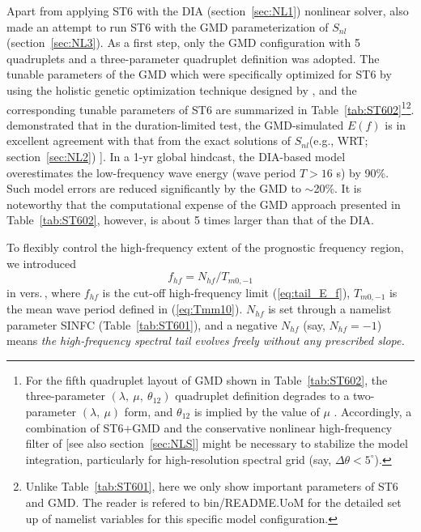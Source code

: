Apart from applying {\code ST6} with the {\code DIA} (section~\ref{sec:NL1}) nonlinear solver, \citet{Liu2018}
also made an attempt to run {\code ST6} with the {\code GMD} parameterization of $S_{nl}$
(section~\ref{sec:NL3}). As a first step, only the {\code GMD} configuration with
5 quadruplets and a three-parameter quadruplet definition
\citep[i.e., {\code G35} in][]{tol:OMOD13d} was adopted. The tunable parameters
of the {\code GMD} which were specifically optimized for {\code ST6} by using the holistic
genetic optimization technique designed by \citet{tol:OMOD13e}, and the
corresponding tunable parameters of {\code ST6} are summarized in
Table~\ref{tab:ST602}\footnote{For the fifth quadruplet layout of {\code GMD} shown
in Table~\ref{tab:ST602}, the three-parameter $(\lambda,\ \mu,\ \theta_{12})$
quadruplet definition degrades to a two-parameter $(\lambda,\ \mu)$ form, and
$\theta_{12}$ is implied by the value of $\mu$ \citep{tol:OMOD13d}. Accordingly,
a combination of {\code ST6+GMD} and the conservative nonlinear high-frequency
filter of \citet{tol:OMOD11} [see also section~\ref{sec:NLS}] might be
necessary to stabilize the model integration, particularly for high-resolution
spectral grid (say, $\Delta \theta < 5^{\circ}$).}\footnote{Unlike
Table~\ref{tab:ST601}, here we only show important parameters of {\code ST6} and
{\code GMD}. The reader is refered to {\code bin/README.UoM} for the detailed
set up of namelist variables for this specific model configuration.}.
\citet{Liu2018} demonstrated that in the duration-limited test, the
{\code GMD}-simulated $E(f)$ is in excellent agreement with that from the exact
 solutions of $S_{nl}$(e.g., {\code WRT}; section~\ref{sec:NL2}) \citep[see also][]{tol:OMOD13d}]. In a 1-yr global
hindcast, the {\code DIA}-based model overestimates the low-frequency wave energy
(wave period $T > 16$ s) by 90\%. Such model errors are reduced significantly
by the {\code GMD} to $\sim$20\%. It is noteworthy that the computational expense
of the {\code GMD} approach presented in Table~\ref{tab:ST602}, however, is about
5 times larger than that of the {\code DIA}.

To flexibly control the high-frequency extent of the prognostic frequency
region, we introduced
\begin{equation}
f_{hf} = N_{hf}/T_{m0, -1}
\end{equation}
in vers.\,\WWver, where $f_{hf}$ is the cut-off high-frequency limit
(\ref{eq:tail_E_f}), $T_{m0,-1}$ is the mean wave period defined in
(\ref{eq:Tmm10}). $N_{hf}$ is set through a namelist parameter SINFC
(Table~\ref{tab:ST601}), and a negative $N_{hf}$ (say, $N_{hf} = -1$)
means \emph{the high-frequency spectral tail evolves freely without any
prescribed slope.}

